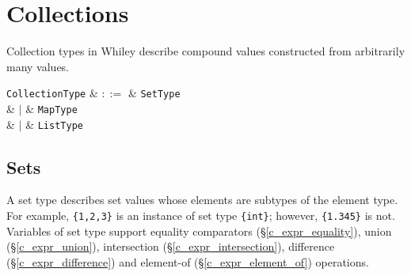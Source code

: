 

\section{Collections}
\label{c_types_collection}

Collection types in Whiley describe compound values constructed from arbitrarily many values.

\begin{syntax}
  \verb+CollectionType+ & $::=$ & \verb+SetType+\\
                        & $|$ & \verb+MapType+\\
                        & $|$ & \verb+ListType+\\
\end{syntax}



\subsection{Sets}
\label{c_types_set}

A set type describes set values whose elements are subtypes of the element type. For example, \lstinline|{1,2,3}| is an instance of set type \lstinline|{int}|; however, \lstinline|{1.345}| is not.  Variables of set type support equality comparators (\S\ref{c_expr_equality}), union (\S\ref{c_expr_union}), intersection (\S\ref{c_expr_intersection}), difference (\S\ref{c_expr_difference}) and element-of (\S\ref{c_expr_element_of}) operations.

